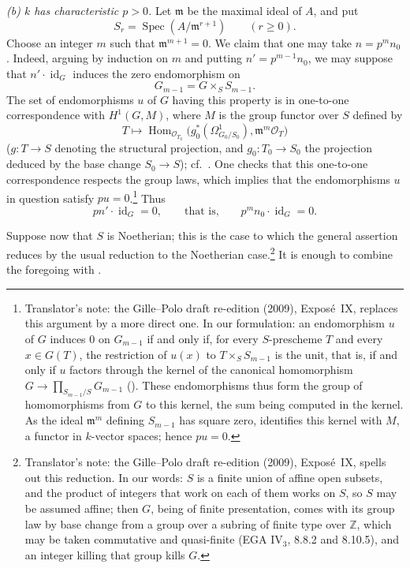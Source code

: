 \smallskip
{}\noindent\textit{(b) \(k\) has characteristic \(p>0\).}
Let \(\mathfrak m\) be the maximal ideal of \(A\), and put
\[
  S_r=\operatorname{Spec}(A/\mathfrak m^{r+1})
  \qquad (r\geq0).
\]
Choose an integer \(m\) such that \(\mathfrak m^{m+1}=0\). We claim that
one may take \(n=p^mn_0\). Indeed, arguing by induction on \(m\) and
putting \(n'=p^{m-1}n_0\), we may suppose that
\(n'\cdot\operatorname{id}_G\) induces the zero endomorphism on
\[
  G_{m-1}=G\times_S S_{m-1}.
\]
The set of endomorphisms \(u\) of \(G\) having this property is in
one-to-one correspondence with \(H^1(G,M)\), where \(M\) is the group
functor over \(S\) defined by
\[
  T\longmapsto
  \operatorname{Hom}_{\mathscr O_{T_0}}
  \bigl(
    g_0^*(\Omega^1_{G_0/S_0}),
    \mathfrak m^m\mathscr O_T
  \bigr)
\]
(\(g:T\to S\) denoting the structural projection, and
\(g_0:T_0\to S_0\) the projection deduced by the base change
\(S_0\to S\)); cf.\ . One checks that this one-to-one
correspondence respects the group laws, which implies that the
endomorphisms \(u\) in question satisfy \(pu=0\).\footnote{Translator's note: the
Gille--Polo draft re-edition (2009), Expos\'e~IX, replaces this argument by a
more direct one. In our formulation: an endomorphism \(u\) of \(G\) induces
\(0\) on \(G_{m-1}\) if and only if, for every \(S\)-prescheme \(T\) and
every \(x\in G(T)\), the restriction of \(u(x)\) to \(T\times_SS_{m-1}\) is
the unit, that is, if and only if \(u\) factors through the kernel of the
canonical homomorphism \(G\to\prod_{S_{m-1}/S}G_{m-1}\)
(). These endomorphisms thus
form the group of homomorphisms from \(G\) to this kernel, the sum being
computed in the kernel. As the ideal \(\mathfrak m^m\) defining \(S_{m-1}\)
has square zero,  identifies
this kernel with \(M\), a functor in \(k\)-vector spaces; hence
\(pu=0\).} Thus
\[
  pn'\cdot\operatorname{id}_G=0,
  \qquad\text{that is,}\qquad
  p^mn_0\cdot\operatorname{id}_G=0.
\]

Suppose now that \(S\) is Noetherian; this is the case to which the
general assertion reduces by the usual reduction to the Noetherian
case.\footnote{Translator's note: the Gille--Polo draft re-edition (2009),
Expos\'e~IX, spells out this reduction. In our words: \(S\) is a finite
union of affine open subsets, and the product of integers that work on each
of them works on \(S\), so \(S\) may be assumed affine; then \(G\), being of
finite presentation, comes with its group law by base change from a group
over a subring of finite type over \(\mathbb Z\), which may be taken
commutative and quasi-finite (EGA IV\(_3\), 8.8.2 and 8.10.5), and an
integer killing that group kills \(G\).}
It is enough to combine the foregoing with .

